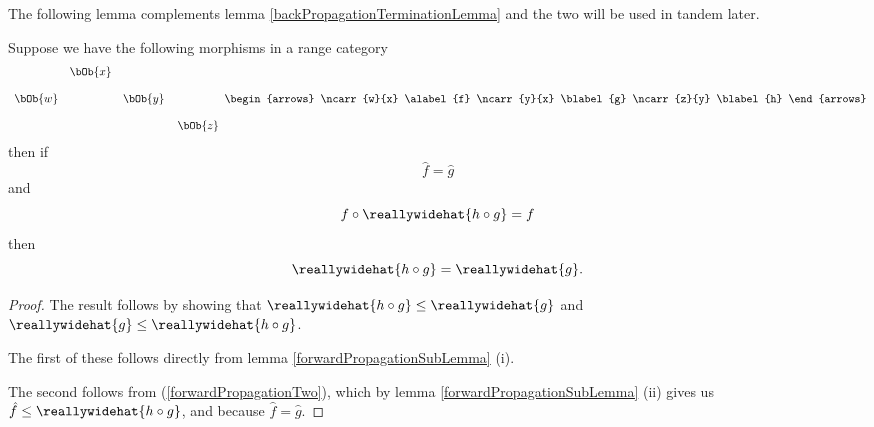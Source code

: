 \begin{oldtt}
The following lemma complements lemma \ref{backPropagationTerminationLemma} 
and the two will be used in tandem later.
\begin{lemma}
Suppose we have the following morphisms in a range category
\[
\begin{array} {c c c c c}
       &\bOb{x}                            \\[0.4cm]
\bOb{w}        &        &\bOb{y}           \\[0.4cm]
       &       &        &         &\kern-0.3cm\bOb{z} 
\end{array}
\begin{arrows}
\ncarr{w}{x} \alabel{f}
\ncarr{y}{x} \blabel{g}
\ncarr{z}{y} \blabel{h}
\end{arrows}
\]
then if 
\begin{equation}
\label{forwardPropagationTight}
\widehat{f}=\widehat{g}
\end{equation}
and 
\begin{equation}
\label{forwardPropagationTwo}
f \circ \reallywidehat{h \circ g}=f
\end{equation}
then 
\begin{equation}
\label{forwardPropagationThree}
\reallywidehat{h \circ g} = \reallywidehat{g}.
\end{equation}
\end{lemma}
\begin{proof}
The result follows by showing that
$\reallywidehat{h \circ g} \leq \reallywidehat{g}$
and
$\reallywidehat{g} \leq \reallywidehat{h \circ g}$.

The first of these 
follows directly from lemma \ref{forwardPropagationSubLemma} (i).

The second follows from (\ref{forwardPropagationTwo}), 
which by lemma \ref{forwardPropagationSubLemma} (ii)
gives us
$\hat{f} \leq \reallywidehat{h \circ g}$,
and because $\hat{f} = \hat{g}$.
\end{proof}
\end{oldtt}

